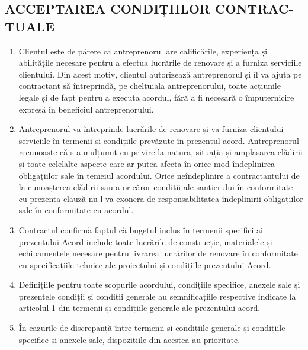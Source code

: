 \begin{multicols}{2}
\subsection{ACCEPTAREA CONDIȚIILOR CONTRAC- TUALE}
\begin{enumerate}
\item Clientul este de părere că antreprenorul are calificările, experiența și abilitățile necesare pentru a efectua lucrările de renovare și a furniza serviciile clientului. Din acest motiv, clientul autorizează antreprenorul și îl va ajuta pe contractant să întreprindă, pe cheltuiala antreprenorului, toate acțiunile legale și de fapt pentru a executa acordul, fără a fi necesară o împuternicire expresă în beneficiul antreprenorului.
\item Antreprenorul va întreprinde lucrările de renovare și va furniza clientului serviciile în termenii și condițiile prevăzute în prezentul acord. Antreprenorul recunoaște că s-a mulțumit cu privire la natura, situația și amplasarea clădirii și toate celelalte aspecte care ar putea afecta în orice mod îndeplinirea obligațiilor sale în temeiul acordului. Orice neîndeplinire a contractantului de la cunoașterea clădirii sau a oricăror condiții ale șantierului în conformitate cu prezenta clauză nu-l va exonera de responsabilitatea îndeplinirii obligațiilor sale în conformitate cu acordul.
\item Contractul confirmă faptul că bugetul inclus în termenii specifici ai prezentului Acord include toate lucrările de construcție, materialele și echipamentele necesare pentru livrarea lucrărilor de renovare în conformitate cu specificațiile tehnice ale proiectului și condițiile prezentului Acord.
\item Definițiile pentru toate scopurile acordului, condițiile specifice, anexele sale și prezentele condiții și condiții generale au semnificațiile respective indicate la articolul 1 din termenii și condițiile generale ale prezentului acord.
\item În cazurile de discrepanță între termenii și condițiile generale și condițiile specifice și anexele sale, dispozițiile din acestea au prioritate.
\end{enumerate}



\end{multicols}
